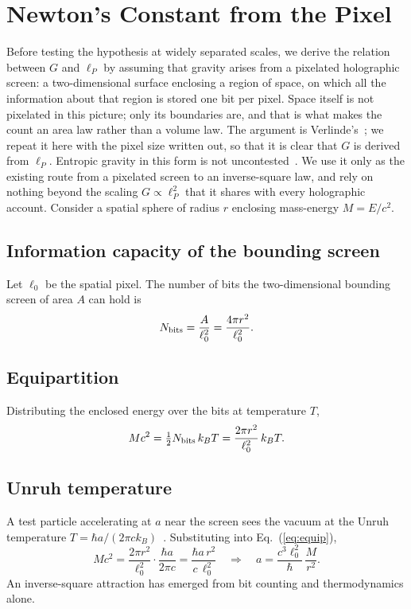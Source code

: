 \documentclass[aps,prd,twocolumn,superscriptaddress,nofootinbib,showkeys]{revtex4-2}
\begin{document}
\section{Newton's Constant from the Pixel}
\label{sec:pixel}

Before testing the hypothesis at widely separated scales, we derive the relation between $G$ and $\ell_P$ by assuming that gravity arises from a pixelated holographic screen: a two-dimensional surface enclosing a region of space, on which all the information about that region is stored one bit per pixel. Space itself is not pixelated in this picture; only its boundaries are, and that is what makes the count an area law rather than a volume law. The argument is Verlinde's~\cite{verlinde2011}; we repeat it here with the pixel size written out, so that it is clear that $G$ is derived from $\ell_P$. Entropic gravity in this form is not uncontested~\cite{visser2011,kobakhidze2011}. We use it only as the existing route from a pixelated screen to an inverse-square law, and rely on nothing beyond the scaling $G\propto\ell_P^2$ that it shares with every holographic account. Consider a spatial sphere of radius $r$ enclosing mass-energy $M = E/c^2$.

\subsection{Information capacity of the bounding screen}
Let $\ell_0$ be the spatial pixel. The number of bits the two-dimensional bounding screen of area $A$ can hold is
\begin{equation}
N_{\rm bits} = \frac{A}{\ell_0^2} = \frac{4\pi r^2}{\ell_0^2}.
\label{eq:nbits}
\end{equation}

\subsection{Equipartition}
Distributing the enclosed energy over the bits at temperature $T$,
\begin{equation}
Mc^2 = \tfrac12 N_{\rm bits}\,k_BT = \frac{2\pi r^2}{\ell_0^2}\,k_BT .
\label{eq:equip}
\end{equation}

\subsection{Unruh temperature}
A test particle accelerating at $a$ near the screen sees the vacuum at the Unruh temperature $T = \hbar a/(2\pi c k_B)$~\cite{unruh1976}. Substituting into Eq.~(\ref{eq:equip}),
\begin{equation}
Mc^2 = \frac{2\pi r^2}{\ell_0^2}\cdot\frac{\hbar a}{2\pi c} = \frac{\hbar a\,r^2}{c\,\ell_0^2}
\quad\Longrightarrow\quad
a = \frac{c^3\ell_0^2}{\hbar}\,\frac{M}{r^2}.
\label{eq:aemerge}
\end{equation}
An inverse-square attraction has emerged from bit counting and thermodynamics alone.
\end{document}
